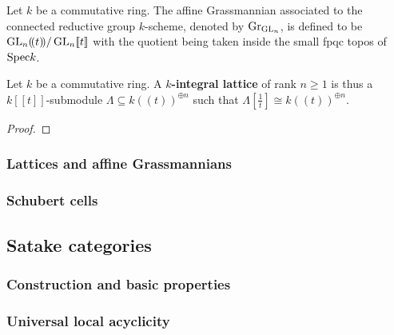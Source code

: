             \begin{definition} \label{def: the_affine_grassmannian_for_GLn}
                Let $k$ be a commutative ring. The affine Grassmannian associated to the connected reductive group $k$-scheme, denoted by $\mathrm{Gr}_{\operatorname{GL}_n}$, is defined to be $\operatorname{GL}_n(\!(t)\!)/\operatorname{GL}_n[\![t]\!]$ with the quotient being taken inside the small fpqc topos of $\mathrm{Spec} k$.
            \end{definition}
            \begin{definition} \label{def: integral_lattices}
                Let $k$ be a commutative ring. A \textbf{$k$-integral lattice} of rank $n \geq 1$ is thus a $k[\![t]\!]$-submodule $\Lambda \subseteq k(\!(t)\!)^{\oplus n}$ such that $\Lambda\left[\frac1t\right] \cong k(\!(t)\!)^{\oplus n}$. 
            \end{definition}
            \begin{proposition}
                
            \end{proposition}
                \begin{proof}
                        
                \end{proof}
        
        \subsubsection{Lattices and affine Grassmannians}
        
        \subsubsection{Schubert cells}
        
    \subsection{Satake categories}
        \subsubsection{Construction and basic properties}
        
        \subsubsection{Universal local acyclicity}
        
